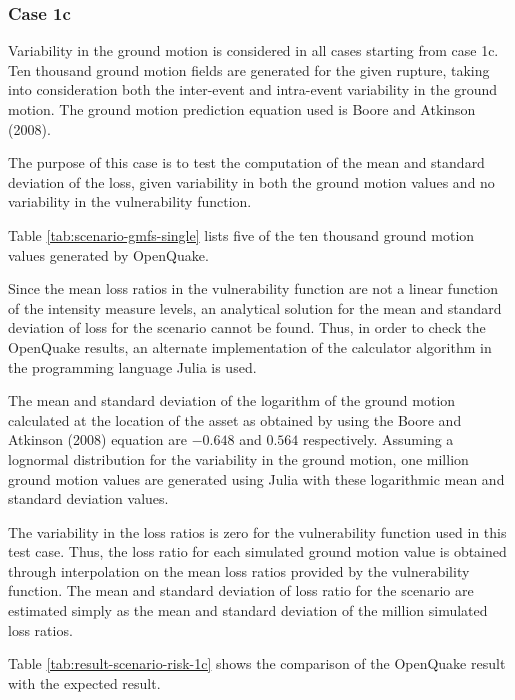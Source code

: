 \subsubsection{Case 1c}
Variability in the ground motion is considered in all cases starting from case 1c. Ten thousand ground motion fields are generated for the given rupture, taking into consideration both the inter-event and intra-event variability in the ground motion. The ground motion prediction equation used is Boore and Atkinson (2008).

The purpose of this case is to test the computation of the mean and standard deviation of the loss, given variability in both the ground motion values and no variability in the vulnerability function.



Table \ref{tab:scenario-gmfs-single} lists five of the ten thousand ground motion values generated by OpenQuake.

Since the mean loss ratios in the vulnerability function are not a linear function of the intensity measure levels, an analytical solution for the mean and standard deviation of loss for the scenario cannot be found. Thus, in order to check the OpenQuake results, an alternate implementation of the calculator algorithm in the programming language Julia is used.

The mean and standard deviation of the logarithm of the ground motion calculated at the location of the asset as obtained by using the Boore and Atkinson (2008) equation are $-0.648$ and $0.564$ respectively. Assuming a lognormal distribution for the variability in the ground motion, one million ground motion values are generated using Julia with these logarithmic mean and standard deviation values.

The variability in the loss ratios is zero for the vulnerability function used in this test case. Thus, the loss ratio for each simulated ground motion value is obtained through interpolation on the mean loss ratios provided by the vulnerability function. The mean and standard deviation of loss ratio for the scenario are estimated simply as the mean and standard deviation of the million simulated loss ratios.



Table \ref{tab:result-scenario-risk-1c} shows the comparison of the OpenQuake result with the expected result.

